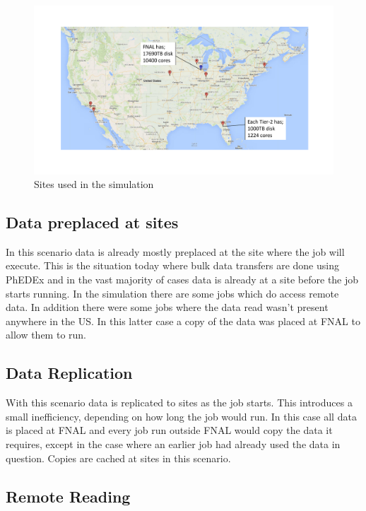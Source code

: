\documentclass[a4paper]{jpconf}
\begin{document}
\begin{figure}
  \includegraphics[trim=80 90 80 90, clip, width=\textwidth]{figures/map.pdf}
  \caption{Sites used in the simulation\label{fig:map}}
\end{figure}

\subsection{Data preplaced at sites\label{sec:today}}

In this scenario data is already mostly preplaced at the site where
the job will execute. This is the situation today where bulk data
transfers are done using PhEDEx and in the vast majority of cases data
is already at a site before the job starts running. In the simulation
there are some jobs which do access remote data. In addition there
were some jobs where the data read wasn't present anywhere in the
US. In this latter case a copy of the data was placed at FNAL to allow
them to run.

\subsection{Data Replication}

With this scenario data is replicated to sites as the job starts. This
introduces a small inefficiency, depending on how long the job would
run. In this case all data is placed at FNAL and every job run outside
FNAL would copy the data it requires, except in the case where an
earlier job had already used the data in question. Copies are cached
at sites in this scenario.

\subsection{Remote Reading}
\end{document}
